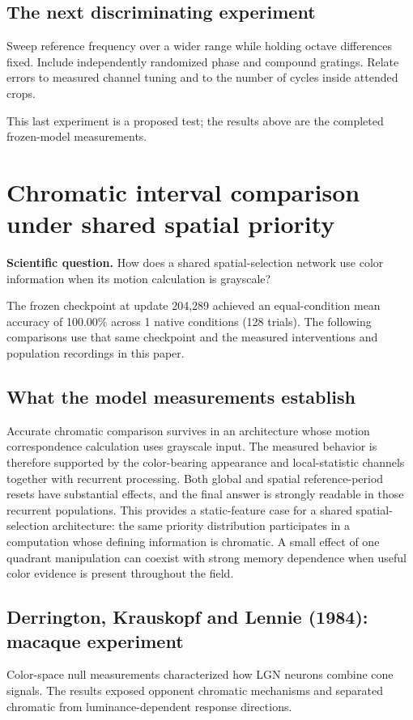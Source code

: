 \documentclass[11pt]{article}
\begin{document}
\subsection{The next discriminating experiment}
Sweep reference frequency over a wider range while holding octave differences fixed. Include independently randomized phase and compound gratings. Relate errors to measured channel tuning and to the number of cycles inside attended crops.

This last experiment is a proposed test; the results above are the completed frozen-model measurements.
\clearpage\section{Chromatic interval comparison under shared spatial priority}
\textbf{Scientific question.} How does a shared spatial-selection network use color information when its motion calculation is grayscale?

The frozen checkpoint at update 204,289 achieved an equal-condition mean accuracy of 100.00\% across 1 native conditions (128 trials). The following comparisons use that same checkpoint and the measured interventions and population recordings in this paper.

\subsection{What the model measurements establish}
Accurate chromatic comparison survives in an architecture whose motion correspondence calculation uses grayscale input. The measured behavior is therefore supported by the color-bearing appearance and local-statistic channels together with recurrent processing. Both global and spatial reference-period resets have substantial effects, and the final answer is strongly readable in those recurrent populations. This provides a static-feature case for a shared spatial-selection architecture: the same priority distribution participates in a computation whose defining information is chromatic. A small effect of one quadrant manipulation can coexist with strong memory dependence when useful color evidence is present throughout the field.

\subsection{Derrington, Krauskopf and Lennie (1984): macaque experiment}
Color-space null measurements characterized how LGN neurons combine cone signals. The results exposed opponent chromatic mechanisms and separated chromatic from luminance-dependent response directions. \cite{bio_derrington}
\end{document}
